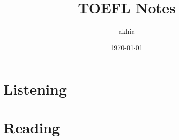\documentclass{report}
\title{TOEFL Notes}
\author{akhia}
\date{\today}
\begin{document}
\chapter{Listening}
























































\chapter{Reading}









\end{document}
